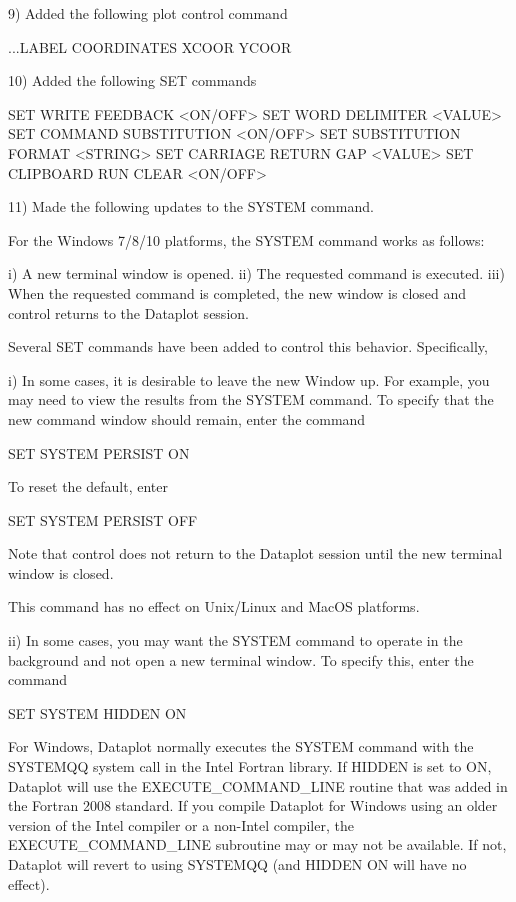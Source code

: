  9) Added the following plot control command

        ...LABEL COORDINATES XCOOR YCOOR

10) Added the following SET commands

       SET WRITE FEEDBACK <ON/OFF>
       SET WORD DELIMITER <VALUE>
       SET COMMAND SUBSTITUTION <ON/OFF>
       SET SUBSTITUTION FORMAT <STRING>
       SET CARRIAGE RETURN GAP <VALUE>
       SET CLIPBOARD RUN CLEAR <ON/OFF>

11) Made the following updates to the SYSTEM command.

    For the Windows 7/8/10 platforms, the SYSTEM command works
    as follows:

      i) A new terminal window is opened.
     ii) The requested command is executed.
    iii) When the requested command is completed, the new window is
         closed and control returns to the Dataplot session.

    Several SET commands have been added to control this behavior.
    Specifically,

      i) In some cases, it is desirable to leave the new Window up.
         For example, you may need to view the results from the
         SYSTEM command.  To specify that the new command window
         should remain, enter the command

              SET SYSTEM PERSIST ON

         To reset the default, enter

              SET SYSTEM PERSIST OFF

         Note that control does not return to the Dataplot session
         until the new terminal window is closed.

         This command has no effect on Unix/Linux and MacOS platforms.

     ii) In some cases, you may want the SYSTEM command to operate in
         the background and not open a new terminal window.  To specify
         this, enter the command

              SET SYSTEM HIDDEN ON

         For Windows, Dataplot normally executes the SYSTEM command with
         the SYSTEMQQ system call in the Intel Fortran library.  If
         HIDDEN is set to ON, Dataplot will use the EXECUTE_COMMAND_LINE
         routine that was added in the Fortran 2008 standard.  If you
         compile Dataplot for Windows using an older version of the Intel
         compiler or a non-Intel compiler, the EXECUTE_COMMAND_LINE
         subroutine may or may not be available.  If not, Dataplot will
         revert to using SYSTEMQQ (and HIDDEN ON will have no effect).

